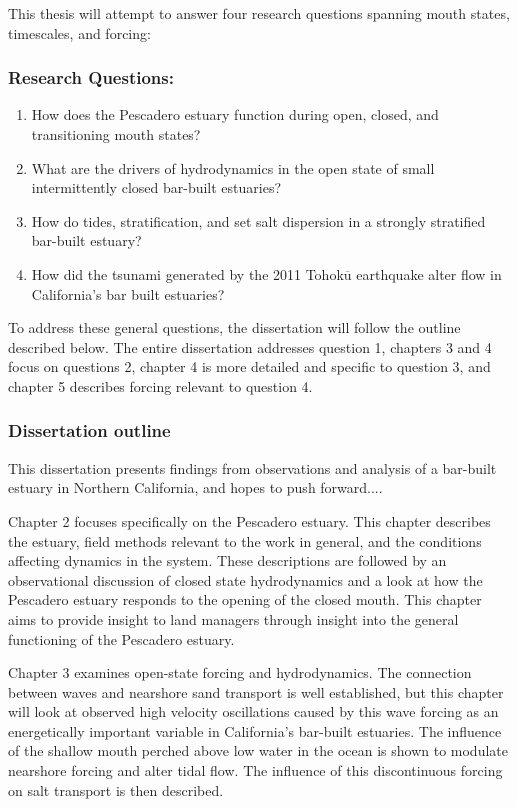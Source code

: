 This thesis will attempt to answer four research questions spanning mouth states, timescales, and forcing: 


\subsubsection{Research Questions:}
\begin{enumerate}
	\item{How does the Pescadero estuary function during open, closed, and transitioning mouth states?}
	\item{What are the drivers of hydrodynamics in the open state of small intermittently closed bar-built estuaries?}
	\item{How do tides, stratification, and  set salt dispersion in a strongly stratified bar-built estuary?}
	\item{How did the tsunami generated by the 2011 Tohok$\overline{\mathrm{u}}$ earthquake alter flow in California's bar built estuaries?}
\end{enumerate}

To address these general questions, the dissertation will follow the outline described below. The entire dissertation addresses question 1, chapters 3 and 4 focus on questions 2, chapter 4 is more detailed and specific to question 3, and chapter 5 describes forcing relevant to question 4.

\subsubsection{Dissertation outline}

This dissertation presents findings from observations and analysis of a bar-built estuary in Northern California, and hopes to push forward....

Chapter 2 focuses specifically on the Pescadero estuary. This chapter describes the estuary, field methods relevant to the work in general, and the conditions affecting dynamics in the system. These descriptions are followed by an observational discussion of closed state hydrodynamics and a look at how the Pescadero estuary responds to the opening of the closed mouth. This chapter aims to provide insight to land managers through insight into the general functioning of the Pescadero estuary.

Chapter 3 examines open-state forcing and hydrodynamics. The connection between waves and nearshore sand transport is well established, but this chapter will look at observed high velocity oscillations caused by this wave forcing as an energetically important variable in California's bar-built estuaries. The influence of the shallow mouth perched above low water in the ocean is shown to modulate nearshore forcing and alter tidal flow. The influence of this discontinuous forcing on salt transport is then described.

